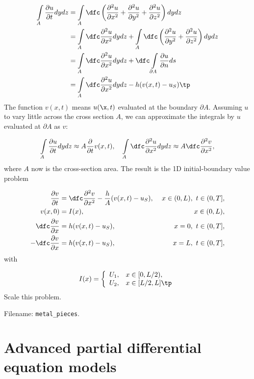 \documentclass[graybox,envcountchap,sectrefs,final]{svmonodo}
\newcounter{doconce:movie:counter}
\newenvironment{doconceexercise}{}{}
\begin{document}
\begin{doconceexercise}
\begin{align*}
\int\limits_A \frac{\partial u}{\partial t}dydz &=
\int\limits_A \dfc\left(
\frac{\partial^2 u}{\partial x^2} +
\frac{\partial^2 u}{\partial y^2} +
\frac{\partial^2 u}{\partial z^2}
\right)dydz \\ 
&=\int\limits_A \dfc
\frac{\partial^2 u}{\partial x^2}
dydz +
\int\limits_A \dfc\left(
\frac{\partial^2 u}{\partial y^2} +
\frac{\partial^2 u}{\partial z^2}
\right)dydz \\ 
& =
\int\limits_A \dfc
\frac{\partial^2 u}{\partial x^2}
dydz +
\dfc\int\limits_{\partial A}\frac{\partial u}{\partial n}ds\\ 
& = \int\limits_A \dfc
\frac{\partial^2 u}{\partial x^2}
dydz -h(v(x,t) -u_S)\tp
\end{align*}
The function $v(x,t)$ means $u(\x,t)$ evaluated at the boundary $\partial A$.
Assuming $u$ to vary little across the cross section $A$, we can
approximate the integrals by $u$ evaluated at $\partial A$ as $v$:

\[ \int\limits_A \frac{\partial u}{\partial t}dydz\approx A
\frac{\partial}{\partial t} v(x,t),
\quad
\int\limits_A \dfc
\frac{\partial^2 u}{\partial x^2}
dydz \approx A \dfc \frac{\partial^2 v}{\partial x^2},
\]
where $A$ now is the cross-section area.
The result is the 1D initial-boundary value problem

\begin{align}
\frac{\partial v}{\partial t} &=
\dfc \frac{\partial^2 v}{\partial x^2}
-\frac{h}{A}(v(x,t) -u_S),\ & x\in (0,L),\ t\in (0,T],\\ 
v(x,0)&=I(x), & x\in (0,L),\\ 
 \dfc\frac{\partial v}{\partial x} &= h(v(x,t)-u_S), & x=0,\ t\in (0,T],\\ 
-\dfc\frac{\partial v}{\partial x} &= h(v(x,t)-u_S), & x=L,\ t\in (0,T],
\end{align}
with

\[
I(x) = \left\lbrace\begin{array}{ll}
U_1, & x\in [0,L/2),\\ 
U_2, & x\in [L/2, L]\tp
\end{array}\right.
\]
Scale this problem.


\noindent Filename: \Verb!metal_pieces!.

\end{doconceexercise}


\chapter{Advanced partial differential equation models}
\end{document}
